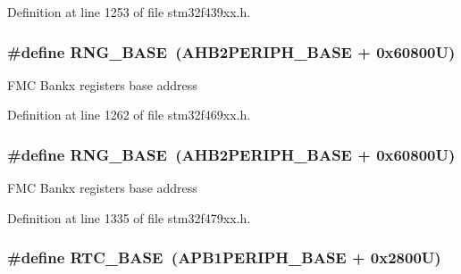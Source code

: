 Definition at line 1253 of file stm32f439xx.\+h.

\subsubsection[{\texorpdfstring{R\+N\+G\+\_\+\+B\+A\+SE}{RNG_BASE}}]{\setlength{\rightskip}{0pt plus 5cm}\#define R\+N\+G\+\_\+\+B\+A\+SE~({\bf A\+H\+B2\+P\+E\+R\+I\+P\+H\+\_\+\+B\+A\+SE} + 0x60800\+U)}\hypertarget{group___peripheral__memory__map_gab92662976cfe62457141e5b4f83d541c}{}\label{group___peripheral__memory__map_gab92662976cfe62457141e5b4f83d541c}
F\+MC Bankx registers base address 

Definition at line 1262 of file stm32f469xx.\+h.

\subsubsection[{\texorpdfstring{R\+N\+G\+\_\+\+B\+A\+SE}{RNG_BASE}}]{\setlength{\rightskip}{0pt plus 5cm}\#define R\+N\+G\+\_\+\+B\+A\+SE~({\bf A\+H\+B2\+P\+E\+R\+I\+P\+H\+\_\+\+B\+A\+SE} + 0x60800\+U)}\hypertarget{group___peripheral__memory__map_gab92662976cfe62457141e5b4f83d541c}{}\label{group___peripheral__memory__map_gab92662976cfe62457141e5b4f83d541c}
F\+MC Bankx registers base address 

Definition at line 1335 of file stm32f479xx.\+h.

\subsubsection[{\texorpdfstring{R\+T\+C\+\_\+\+B\+A\+SE}{RTC_BASE}}]{\setlength{\rightskip}{0pt plus 5cm}\#define R\+T\+C\+\_\+\+B\+A\+SE~({\bf A\+P\+B1\+P\+E\+R\+I\+P\+H\+\_\+\+B\+A\+SE} + 0x2800\+U)}\hypertarget{group___peripheral__memory__map_ga4265e665d56225412e57a61d87417022}{}\label{group___peripheral__memory__map_ga4265e665d56225412e57a61d87417022}


